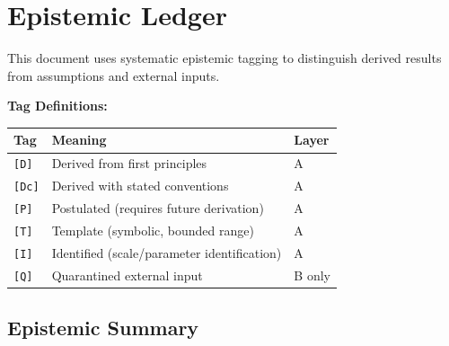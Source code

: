 \documentclass[11pt,a4paper]{article}
\newcommand{\tagD}{\textcolor{green!50!black}{\texttt{[D]}}}
\newcommand{\tagDc}{\textcolor{blue!70!black}{\texttt{[Dc]}}}
\newcommand{\tagP}{\textcolor{orange!80!black}{\texttt{[P]}}}
\newcommand{\tagQ}{\textcolor{red!70!black}{\texttt{[Q]}}}
\newcommand{\tagI}{\textcolor{purple!70!black}{\texttt{[I]}}}
\newcommand{\tagT}{\textcolor{cyan!70!black}{\texttt{[T]}}}
\theoremstyle{definition}
\begin{document}
\tableofcontents
\newpage

\section{Epistemic Ledger}
\label{sec:epistemic}


\begin{epistemicbox}
This document uses systematic epistemic tagging to distinguish derived results
from assumptions and external inputs.

\textbf{Tag Definitions:}
\begin{center}
\begin{tabular}{lll}
\toprule
Tag & Meaning & Layer \\
\midrule
\tagD{} & Derived from first principles & A \\
\tagDc{} & Derived with stated conventions & A \\
\tagP{} & Postulated (requires future derivation) & A \\
\tagT{} & Template (symbolic, bounded range) & A \\
\tagI{} & Identified (scale/parameter identification) & A \\
\tagQ{} & Quarantined external input & B only \\
\bottomrule
\end{tabular}
\end{center}
\end{epistemicbox}

\subsection{Epistemic Summary}
\label{subsec:epistemic-summary}
\end{document}
